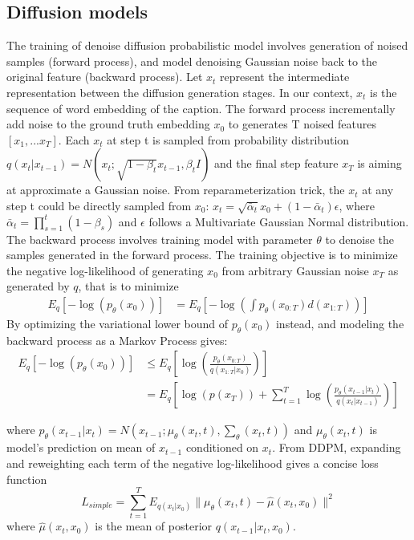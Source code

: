 \documentclass{article}
\begin{document}
\subsection{Diffusion models}
The training of denoise diffusion probabilistic model involves generation of noised samples (forward process), and model denoising Gaussian noise back to the original feature (backward process). Let $x_t$ represent the intermediate representation between the diffusion generation stages. In our context, $x_t$ is the sequence of word embedding of the caption. The forward process incrementally add noise to the ground truth embedding $x_0$ to generates T noised features $[x_1, ... x_T]$. Each $x_t$ at step t is sampled from probability distribution $q(x_t | x_{t-1}) = N(x_t; \sqrt{1 - \beta_t}x_{t-1}, \beta_t I)$ and the final step feature $x_T$ is aiming at approximate a Gaussian noise. From reparameterization trick, the $x_t$ at any step t could be directly sampled from $x_0$: $x_t = \sqrt{\bar{\alpha}_t}x_0 + (1 - \bar{\alpha}_t) \epsilon$, where $\bar{\alpha}_t = \prod_{s = 1}^t(1 - \beta_s)$ and $\epsilon$ follows a Multivariate Gaussian Normal distribution. The backward process involves training model with parameter $\theta$ to denoise the samples generated in the forward process. The training objective is to minimize the negative log-likelihood of generating $x_0$ from arbitrary Gaussian noise $x_T$ as generated by $q$, that is to minimize
\begin{align*}
    E_q[-\log(p_{\theta}(x_0))] &= E_q[-\log(\int p_{\theta}(x_{0:T}) d(x_{1:T}))]
\end{align*}
By optimizing the variational lower bound of $p_{\theta}(x_0)$ instead, and modeling the backward process as a Markov Process gives:
\begin{align*}
    E_q[-\log(p_{\theta}(x_0))] &\leq E_q[\log(\frac{p_{\theta}(x_{0:T})}{q(x_{1:T}| x_0)})] \\
    &= E_q[\log(p(x_T)) + \sum_{t = 1}^T\log(\frac{p_{\theta}(x_{t-1} | x_t)}{q(x_t | x_{t-1})})]
\end{align*}

where $p_{\theta}(x_{t-1} | x_t) = N(x_{t-1}; \mu_{\theta}(x_t, t), \sum_{\theta}(x_t, t))$ and $\mu_{\theta}(x_t, t)$ is model's prediction on mean of $x_{t-1}$ conditioned on $x_t$. From DDPM\cite{ddpm}, expanding and reweighting each term of the negative log-likelihood gives a concise loss function 
$$L_{simple} = \sum_{t=1}^T E_{q(x_t | x_0)} \|\mu_{\theta}(x_t, t) - \hat{\mu}(x_t, x_0)\|^2$$
where $\hat{\mu}(x_t, x_0)$ is the mean of posterior $q(x_{t-1} | x_t, x_0)$.
\end{document}
